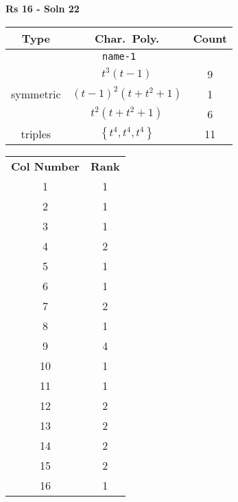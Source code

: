\documentclass{article}
\begin{document}
    \textbf{Rs 16 - Soln 22}
    \begin{table}
    \begin{tabular}{|c|c|c|}
    \hline
    \textbf{Type} & \textbf{Char.~Poly.} & \textbf{Count} \\
    \hline \multicolumn{3}{|c|}{\texttt{name-1}} \\ \hline
    \multirow{3}{*}{symmetric}
    & $t^3(t - 1)$ & 9 \\
    & $(t - 1)^2(t + t^2 + 1)$ & 1 \\
    & $t^2(t + t^2 + 1)$ & 6 \\
    \hline
    \multirow{1}{*}{triples}
    & $\left\{t^4,t^4,t^4\right\}$ & 11 \\
    \hline
    \end{tabular}
    \end{table}
    \begin{table}
    \begin{tabular}{|c|c|}
    \hline
    \textbf{Col Number} & \textbf{Rank}\\
    1 & 1 \\ 
    2 & 1 \\ 
    3 & 1 \\ 
    4 & 2 \\ 
    5 & 1 \\ 
    6 & 1 \\ 
    7 & 2 \\ 
    8 & 1 \\ 
    9 & 4 \\ 
    10 & 1 \\ 
    11 & 1 \\ 
    12 & 2 \\ 
    13 & 2 \\ 
    14 & 2 \\ 
    15 & 2 \\ 
    16 & 1 \\ 
    \hline
    \end{tabular}
    \end{table}
    \newpage
\end{document}
